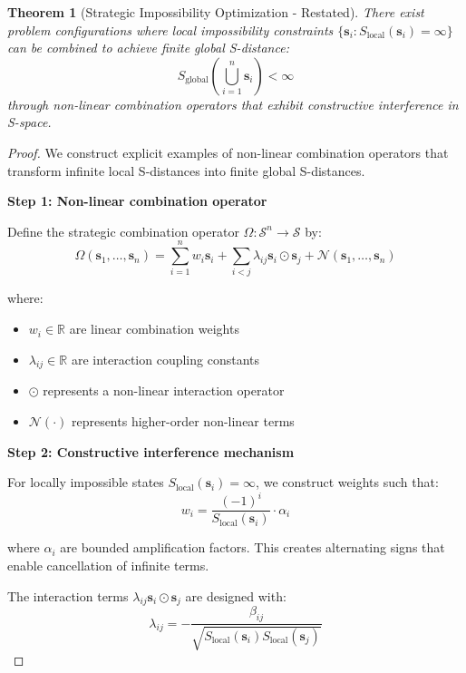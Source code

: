 \documentclass[12pt,a4paper]{article}
\newtheorem{theorem}{Theorem}
\begin{document}
\begin{theorem}[Strategic Impossibility Optimization - Restated]
There exist problem configurations where local impossibility constraints $\{\mathbf{s}_i : S_{\text{local}}(\mathbf{s}_i) = \infty\}$ can be combined to achieve finite global S-distance:
\begin{equation}
S_{\text{global}}\left(\bigcup_{i=1}^n \mathbf{s}_i\right) < \infty
\end{equation}
through non-linear combination operators that exhibit constructive interference in S-space.
\end{theorem}

\begin{proof}
We construct explicit examples of non-linear combination operators that transform infinite local S-distances into finite global S-distances.

\textbf{Step 1: Non-linear combination operator}

Define the strategic combination operator $\Omega: \mathcal{S}^n \to \mathcal{S}$ by:
\begin{equation}
\Omega(\mathbf{s}_1, \ldots, \mathbf{s}_n) = \sum_{i=1}^n w_i \mathbf{s}_i + \sum_{i<j} \lambda_{ij} \mathbf{s}_i \odot \mathbf{s}_j + \mathcal{N}(\mathbf{s}_1, \ldots, \mathbf{s}_n)
\end{equation}

where:
\begin{itemize}
\item $w_i \in \mathbb{R}$ are linear combination weights
\item $\lambda_{ij} \in \mathbb{R}$ are interaction coupling constants
\item $\odot$ represents a non-linear interaction operator
\item $\mathcal{N}(\cdot)$ represents higher-order non-linear terms
\end{itemize}

\textbf{Step 2: Constructive interference mechanism}

For locally impossible states $S_{\text{local}}(\mathbf{s}_i) = \infty$, we construct weights such that:
\begin{equation}
w_i = \frac{(-1)^i}{S_{\text{local}}(\mathbf{s}_i)} \cdot \alpha_i
\end{equation}

where $\alpha_i$ are bounded amplification factors. This creates alternating signs that enable cancellation of infinite terms.

The interaction terms $\lambda_{ij} \mathbf{s}_i \odot \mathbf{s}_j$ are designed with:
\begin{equation}
\lambda_{ij} = -\frac{\beta_{ij}}{\sqrt{S_{\text{local}}(\mathbf{s}_i) S_{\text{local}}(\mathbf{s}_j)}}
\end{equation}


\end{proof}
\end{document}
